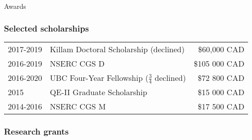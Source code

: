 \documentclass[12pt]{article}
\begin{document}
\noindent\begin{rSection}{Awards}

\subsubsection*{Selected scholarships}
\begin{tabular}{llr}

2017-2019 & Killam Doctoral Scholarship (declined) & \$60,000 CAD\\
2016-2019 & NSERC CGS D &  \$105 000 CAD\\
2016-2020 & UBC Four-Year Fellowship ($\frac{3}{4}$ declined) & \$72 800 CAD\\
2015 & QE-II Graduate Scholarship & \$15 000 CAD\\
2014-2016 & NSERC CGS M & \$17 500 CAD\\
\end{tabular}



\subsubsection*{Research grants}
\begin{tabular}{llr}


\end{tabular}
\end{rSection}
\end{document}
